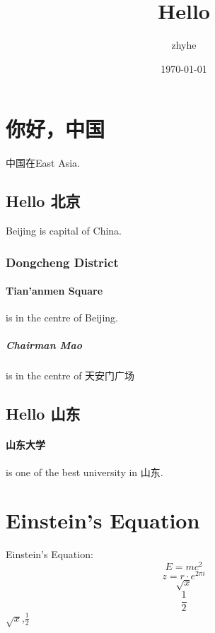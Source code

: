 \documentclass{article}
\title{Hello}
\author{zhyhe}
\date{\today}
\begin{document}
\maketitle
\tableofcontents
\section{你好，中国}
中国在East Asia.
\subsection{Hello 北京}
Beijing is capital of China.
\subsubsection{Dongcheng District}
\paragraph{Tian'anmen Square}is in the centre of Beijing.
\subparagraph{Chairman Mao}is in the centre of 天安门广场

\subsection{Hello 山东}
\paragraph{山东大学}	is one of the best university in 山东.

\section{Einstein's Equation}


Einstein's Equation:
\[E=mc^2\]
\[z=r \cdot e^{2\pi i}\]
\[\sqrt{x}\]
\[\frac{1}{2}\]
$\sqrt{x}$,$\frac{1}{2}$
\end{document}

